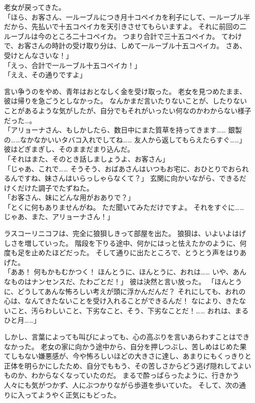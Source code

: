 老女が戻ってきた。\\
「ほら、お客さん、一ルーブルにつき月十コペイカを利子にして、一ルーブル半だから、先払いで十五コペイカを天引きさせてもらいますよ。
それに前回の二ルーブルは今のところ二十コペイカ。
つまり合計で三十五コペイカ。
てわけで、お客さんの時計の受け取り分は、しめて一ルーブル十五コペイカ。
さあ、受けとんなさいな！」\\
「えっ、合計で一ルーブル十五コペイカ！」\\
「ええ、その通りですよ」

言い争うのをやめ、青年はおとなしく金を受け取った。
老女を見つめたまま、彼は帰りを急ごうとしなかった。
なんかまだ言いたりないことが、したりないことがあるような気がしたが、自分でもそれがいったい何なのかわからない様子だった…。\\
「アリョーナさん、もしかしたら、数日中にまた質草を持ってきます……
銀製の……なかなかいいタバコ入れでしてね……
友人から返してもらえたらすぐ……」
彼はどぎまぎし、そのままだまり込んだ。\\
「それはまた、そのとき話しましょうよ、お客さん」\\
「じゃあ、これで……
そうそう、おばあさんはいつもお宅に、おひとりでおられるんですね、妹さんはいらっしゃらなくて？」
玄関に向かいながら、できるだけくだけた調子でたずねた。\\
「お客さん、妹にどんな用がおありで？」\\
「とくに何もありませんがね。
ただ聞いてみただけですよ。
それをすぐに……
じゃあ、また、アリョーナさん！」

ラスコーリニコフは、完全に狼狽しきって部屋を出た。
狼狽は、いよいよはげしさを増していった。
階段を下りる途中、何かにはっと怯えたかのように、何度も足を止めたほどだった。
そして通りに出たところで、とうとう声をはりあげた。\\
「ああ！
何もかもむかつく！
ほんとうに、ほんとうに、おれは……
いや、あんなものはナンセンスだ、たわごとだ！」
彼は決然と言い放った。
「ほんとうに、どうしてあんな怖ろしい考えが頭に浮かんだんだ？
それにしても、おれの心は、なんてきたないことを受け入れることができるんだ！
なにより、きたないこと、汚らわしいこと、下劣なこと、そう、下劣なことだ！……
おれは、まるひと月……」

しかし、言葉によっても叫びによっても、心の高ぶりを言いあらわすことはできなかった。
老女の家に向かう途中から、自分を押しつぶし、苦しめはじめた果てしもない嫌悪感が、今や怖ろしいほどの大きさに達し、あまりにもくっきりと正体を明らかにしたため、自分でももう、その苦しさからどう逃げ隠れしてよいものか、わからなくなっていたのだ。
まるで酔っぱらったように、行きかう人々にも気がつかず、人にぶつかりながら歩道を歩いていた。
そして、次の通りに入ってようやく正気にもどった。

